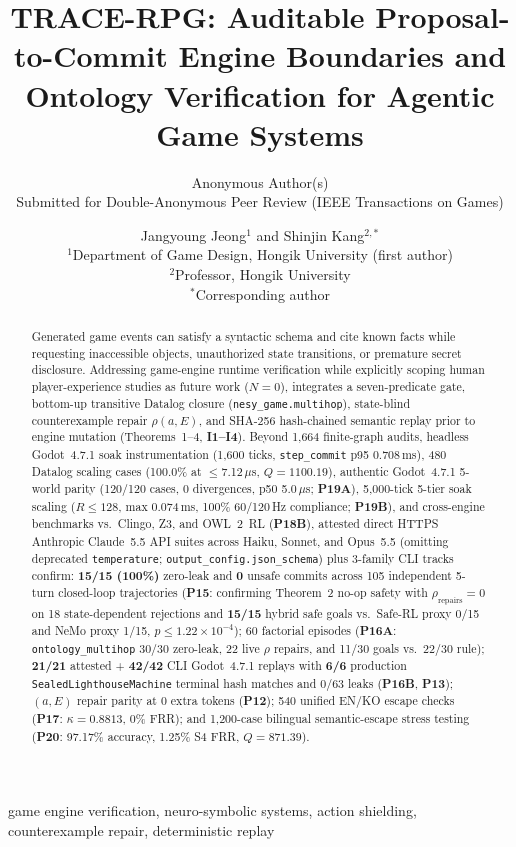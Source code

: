 \documentclass[journal]{IEEEtran}
\title{TRACE-RPG: Auditable Proposal-to-Commit Engine Boundaries and Ontology Verification for Agentic Game Systems}
\author{Anonymous Author(s)\\
\small Submitted for Double-Anonymous Peer Review (IEEE Transactions on Games)}
\author{Jangyoung Jeong$^{1}$ and Shinjin Kang$^{2,*}$\\
\small $^{1}$Department of Game Design, Hongik University (first author)\\
\small $^{2}$Professor, Hongik University\\
\small $^{*}$Corresponding author}
\begin{document}
\maketitle

\begin{abstract}
Generated game events can satisfy a syntactic schema and cite known facts while requesting inaccessible objects, unauthorized state transitions, or premature secret disclosure. Addressing game-engine runtime verification while explicitly scoping human player-experience studies as future work ($N{=}0$), \system{} integrates a seven-predicate gate, bottom-up transitive Datalog closure (\texttt{nesy\_game.multihop}), state-blind counterexample repair $\rho(a,E)$, and SHA-256 hash-chained semantic replay prior to engine mutation (Theorems~1--4, \textbf{I1--I4}). Beyond 1,664 finite-graph audits, headless Godot~4.7.1 soak instrumentation (1,600 ticks, \texttt{step\_commit} p95 0.708\,ms), 480 Datalog scaling cases (100.0\% at $\le$7.12\,$\mu$s, $Q{=}1100.19$), authentic Godot~4.7.1 5-world parity (120/120 cases, 0 divergences, p50 5.0\,$\mu$s; \textbf{P19A}), 5,000-tick 5-tier soak scaling ($R{\le}128$, max 0.074\,ms, 100\% 60/120\,Hz compliance; \textbf{P19B}), and cross-engine benchmarks vs.\ Clingo, Z3, and OWL~2~RL (\textbf{P18B}), attested direct HTTPS Anthropic Claude~5.5 API suites across Haiku, Sonnet, and Opus~5.5 (omitting deprecated \texttt{temperature}; \texttt{output\_config.json\_schema}) plus 3-family CLI tracks confirm: \textbf{15/15 (100\%)} zero-leak and \textbf{0} unsafe commits across 105 independent 5-turn closed-loop trajectories (\textbf{P15}: confirming Theorem~2 no-op safety with $\rho_{\mathrm{repairs}}{=}0$ on 18 state-dependent rejections and \textbf{15/15} hybrid safe goals vs.\ Safe-RL proxy 0/15 and NeMo proxy 1/15, $p{\le}1.22{\times}10^{-4}$); 60 factorial episodes (\textbf{P16A}: \texttt{ontology\_multihop} 30/30 zero-leak, 22 live $\rho$ repairs, and 11/30 goals vs.\ 22/30 rule); \textbf{21/21} attested + \textbf{42/42} CLI Godot~4.7.1 replays with \textbf{6/6} production \texttt{SealedLighthouseMachine} terminal hash matches and 0/63 leaks (\textbf{P16B}, \textbf{P13}); $(a,E)$ repair parity at 0 extra tokens (\textbf{P12}); 540 unified EN/KO escape checks (\textbf{P17}: $\kappa{=}0.8813$, 0\% FRR); and 1,200-case bilingual semantic-escape stress testing (\textbf{P20}: 97.17\% accuracy, 1.25\% S4 FRR, $Q{=}871.39$).
\end{abstract}


\begin{IEEEkeywords}
game engine verification, neuro-symbolic systems, action shielding, counterexample repair, deterministic replay
\end{IEEEkeywords}
\end{document}
